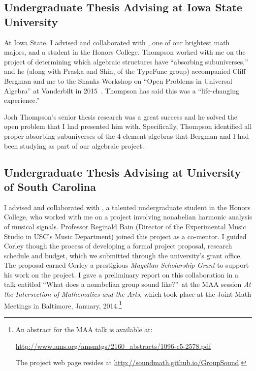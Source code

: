 \bigskip

\subsection{Undergraduate Thesis Advising at Iowa State University} At Iowa State, I advised and collaborated with , one of our brightest math majors, and a student in the Honors College. Thompson worked with me on the project of determining which algebraic structures have ``absorbing subuniverses,'' and he (along with Praska and Shin, of the TypeFunc group) accompanied Cliff Bergman and me to the Shanks Workshop on ``Open Problems in Universal Algebra'' at Vanderbilt in 2015~\cite{Shanks}.  Thompson has said this was a ``life-changing experience.''

Josh Thompson's senior thesis research was a great success and he solved the open problem that I had presented him with. Specifically, Thompson identified all proper absorbing subuniverses of the 4-element algebras that Bergman and I had been studying as part of our algebraic \csp project.

\bigskip

\subsection{Undergraduate Thesis Advising at University of South Carolina}
I advised and collaborated with , a talented undergraduate student in the Honors College, who worked with me on a project involving nonabelian harmonic analysis of musical signals. Professor Reginald Bain (Director of the Experimental Music Studio in USC's Music Department) joined this project as a co-mentor. I guided Corley though the process of developing a formal project proposal, research schedule and budget, which we submitted through the university's grant office. The proposal earned Corley a prestigious \emph{Magellan Scholarship Grant} to support his work on the project. I gave a preliminary report on this collaboration in a talk entitled ``What does a nonabelian group sound like?''~at the MAA session \emph{At the Intersection of Mathematics and the Arts}, which took place at the Joint Math Meetings in Baltimore, January, 2014.\footnote{An abstract for the MAA talk is available at:

  \url{http://www.ams.org/amsmtgs/2160_abstracts/1096-c5-2578.pdf}

The project web page resides at \url{http://soundmath.github.io/GroupSound}.}

